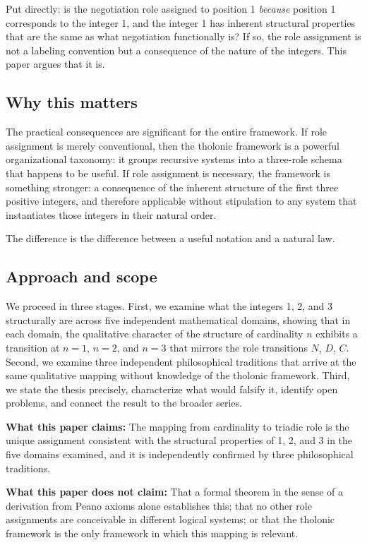 \documentclass[12pt]{article}
\begin{document}
Put directly: is the negotiation role assigned to position 1
\emph{because} position 1 corresponds to the integer 1, and the integer
1 has inherent structural properties that are the same as what
negotiation functionally is? If so, the role assignment is not a
labeling convention but a consequence of the nature of the integers.
This paper argues that it is.

\subsection{Why this matters}\label{why-this-matters}

The practical consequences are significant for the entire framework. If
role assignment is merely conventional, then the tholonic framework is a
powerful organizational taxonomy: it groups recursive systems into a
three-role schema that happens to be useful. If role assignment is
necessary, the framework is something stronger: a consequence of the
inherent structure of the first three positive integers, and therefore
applicable without stipulation to any system that instantiates those
integers in their natural order.

The difference is the difference between a useful notation and a natural
law.

\subsection{Approach and scope}\label{approach-and-scope}

We proceed in three stages. First, we examine what the integers 1, 2,
and 3 structurally are across five independent mathematical domains,
showing that in each domain, the qualitative character of the structure
of cardinality \(n\) exhibits a transition at \(n = 1\), \(n = 2\), and
\(n = 3\) that mirrors the role transitions \(N\), \(D\), \(C\). Second,
we examine three independent philosophical traditions that arrive at the
same qualitative mapping without knowledge of the tholonic framework.
Third, we state the thesis precisely, characterize what would falsify
it, identify open problems, and connect the result to the broader
series.

\textbf{What this paper claims:} The mapping from cardinality to triadic
role is the unique assignment consistent with the structural properties
of 1, 2, and 3 in the five domains examined, and it is independently
confirmed by three philosophical traditions.

\textbf{What this paper does not claim:} That a formal theorem in the
sense of a derivation from Peano axioms alone establishes this; that no
other role assignments are conceivable in different logical systems; or
that the tholonic framework is the only framework in which this mapping
is relevant.
\end{document}
